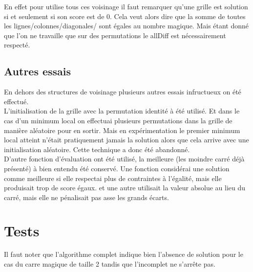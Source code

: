\documentclass[12pt,a4paper]{article}
\begin{document}
En effet pour utilise tous ces voisinage il faut remarquer qu'une grille est solution si et seulement si son score est de 0. Cela veut alors dire que la somme de toutes les lignes/colonnes/diagonales/ sont égales au nombre magique. Mais étant donné que l'on ne travaille que sur des permutations le allDiff est nécessairement respecté.

\subsection{Autres essais}

En dehors des structures de voisinage plusieurs autres essais infructueux on été effectué.\\

L'initialisation de la grille avec la permutation identité à été utilisé. Et dans le cas d'un minimum local on effectuai plusieurs permutations dans la grille de manière aléatoire pour en sortir. Mais en expérimentation le premier minimum local atteint n’était pratiquement jamais la solution alors que cela arrive avec une initialisation aléatoire. Cette technique a donc été abandonné.\\

D'autre fonction d'évaluation ont été utilisé, la meilleure (les moindre carré déjà présenté) à bien entendu été conservé. Une fonction considérai une solution comme meilleure si elle respectai plus de contraintes à l'égalité, mais elle produisait trop de score égaux. et une autre utilisait la valeur absolue au lieu du carré, mais elle ne pénalisait pas asse les grands écarts.

\section{Tests}

Il faut noter que l'algorithme complet indique bien l’absence de solution pour le cas du carre magique de taille 2 tandis que l'incomplet ne s'arrête pas.
\end{document}
